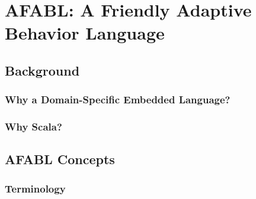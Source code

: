 \chapter{AFABL: A Friendly Adaptive Behavior Language}

\section{Background}

\subsection{Why a Domain-Specific Embedded Language?}

\subsection{Why Scala?}

\section{AFABL Concepts}

\subsection{Terminology}


